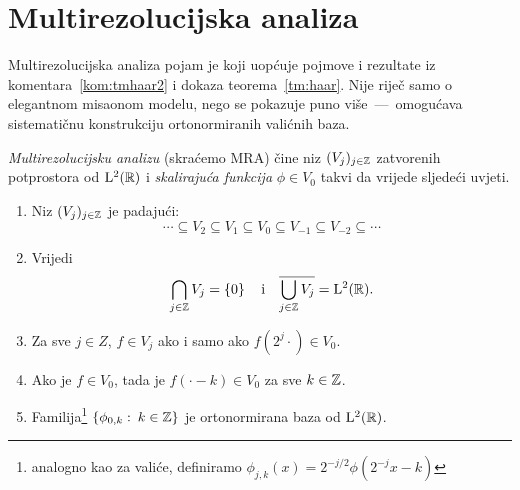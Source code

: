 \documentclass[main.tex]{subfiles}
\begin{document}
\section{Multirezolucijska analiza}\label{sec:mra}
Multirezolucijska analiza pojam je koji uopćuje
pojmove i rezultate iz komentara~\ref{kom:tmhaar2}
i dokaza teorema~\ref{tm:haar}.
Nije riječ samo o elegantnom misaonom modelu, nego
se pokazuje puno više~---~omogućava sistematičnu konstrukciju
ortonormiranih valićnih baza.

\begin{definicija}
	\emph{Multirezolucijsku analizu} (skraćemo MRA)
	čine niz \( (V_j)_{j \in \mathbb{Z}} \) zatvorenih potprostora od \( \mathrm{L}^2(\mathbb{R}) \)
	i \emph{skalirajuća funkcija} \( \phi \in V_0 \) takvi da vrijede sljedeći uvjeti.
	\begin{enumerate}[label=(MRA\arabic*)]
		\item Niz \( (V_j)_{j \in \mathbb{Z}} \) je padajući:
		      \begin{equation}
			      \cdots \subseteq V_2 \subseteq V_1 \subseteq V_0
			      \subseteq V_{-1} \subseteq V_{-2} \subseteq \cdots
		      \end{equation} \label{i:mra1}
		\item Vrijedi
		      \begin{equation}
			      \bigcap_{j \in \mathbb{Z}} V_j = \left\{ 0 \right\}
			      \quad \text i \quad
			      \overline{\bigcup_{j \in \mathbb{Z}} V_j} = \mathrm{L}^2(\mathbb{R}).
		      \end{equation} \label{i:mra2}

		\item Za sve \( j \in Z \), \( f \in V_j \) ako i samo ako \( f(2^j\cdot) \in V_0 \). \label{i:mra3}
		\item Ako je \( f \in V_0 \), tada je \( f(\cdot - k) \in V_0 \) za sve \( k \in \mathbb{Z} \). \label{i:mra4}
		\item Familija\footnote{analogno kao za valiće, definiramo \( \phi_{j,k}(x)=2^{-j/2}\phi(2^{-j}x-k)\)} \( \left\{ \phi_{0,k} \, \colon \, k \in \mathbb{Z} \right\} \) je ortonormirana baza od
		      \( \mathrm{L}^2(\mathbb{R}) \). \label{i:mra5}
	\end{enumerate}
\end{definicija}
\end{document}
